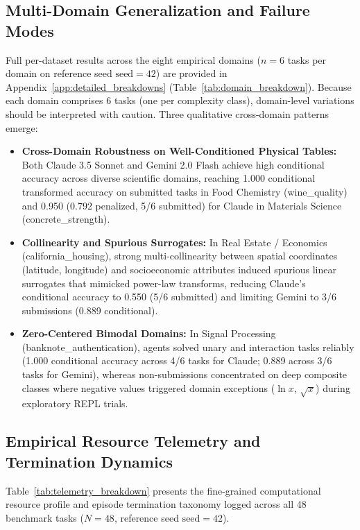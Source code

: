 \documentclass[sigconf]{acmart}
\begin{document}
\subsection{Multi-Domain Generalization and Failure Modes}
Full per-dataset results across the eight empirical domains ($n=6$ tasks per domain on reference seed $\text{seed}=42$) are provided in Appendix~\ref{app:detailed_breakdowns} (Table~\ref{tab:domain_breakdown}). Because each domain comprises 6 tasks (one per complexity class), domain-level variations should be interpreted with caution. Three qualitative cross-domain patterns emerge:
\begin{itemize}
    \item \textbf{Cross-Domain Robustness on Well-Conditioned Physical Tables:} Both Claude 3.5 Sonnet and Gemini 2.0 Flash achieve high conditional accuracy across diverse scientific domains, reaching 1.000 conditional transformed accuracy on submitted tasks in Food Chemistry (\textsf{wine\_quality}) and 0.950 (0.792 penalized, 5/6 submitted) for Claude in Materials Science (\textsf{concrete\_strength}).
    \item \textbf{Collinearity and Spurious Surrogates:} In Real Estate / Economics (\textsf{california\_housing}), strong multi-collinearity between spatial coordinates (\textsf{latitude}, \textsf{longitude}) and socioeconomic attributes induced spurious linear surrogates that mimicked power-law transforms, reducing Claude's conditional accuracy to 0.550 (5/6 submitted) and limiting Gemini to 3/6 submissions (0.889 conditional).
    \item \textbf{Zero-Centered Bimodal Domains:} In Signal Processing (\textsf{banknote\_authentication}), agents solved unary and interaction tasks reliably (1.000 conditional accuracy across 4/6 tasks for Claude; 0.889 across 3/6 tasks for Gemini), whereas non-submissions concentrated on deep composite classes where negative values triggered domain exceptions ($\ln x$, $\sqrt{x}$) during exploratory REPL trials.
\end{itemize}


\subsection{Empirical Resource Telemetry and Termination Dynamics}
Table~\ref{tab:telemetry_breakdown} presents the fine-grained computational resource profile and episode termination taxonomy logged across all 48 benchmark tasks ($N=48$, reference seed $\text{seed}=42$). 
\end{document}
